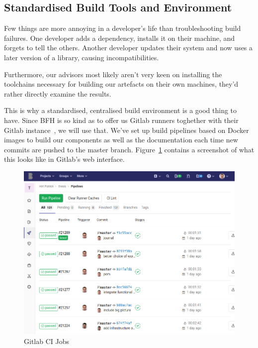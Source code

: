 \subsection{Standardised Build Tools and Environment}\label{subsec:standardised-build-tools-and-environment}
Few things are more annoying in a developer's life than troubleshooting build failures.
One developer adds a dependency, installs it on their machine, and forgets to tell the others.
Another developer updates their system and now uses a later version of a library, causing incompatibilities.

Furthermore,
our advisors most likely aren't very keen on installing the toolchains necessary for building our artefacts on their own machines,
they'd rather directly examine the results.

This is why a standardised, centralised build environment is a good thing to have.
Since \gls{BFH} is so kind as to offer us Gitlab runners toghether with their Gitlab instance~\cite{gitlab},
we will use that.
We've set up build pipelines based on Docker images to build our components as well as the documentation each time new commits are pushed to the master branch.
Figure~\ref{fig:gitlabcijobs} contains a screenshot of what this looks like in Gitlab's web interface.

\begin{figure}
    \begin{center}
        \includegraphics[width=0.8\linewidth]{images/gitlabcijobs.png}
        \caption{Gitlab CI Jobs}
        \label{fig:gitlabcijobs}
    \end{center}
\end{figure}

